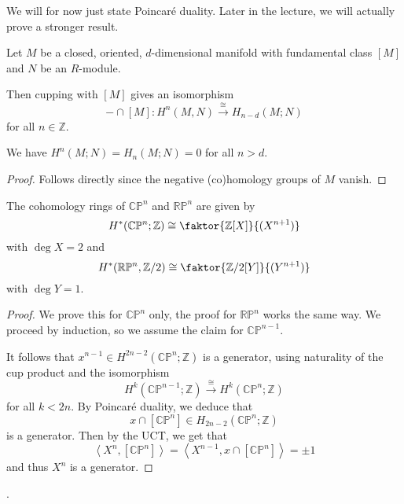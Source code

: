 We will for now just state Poincaré duality.
Later in the lecture, we will actually prove a stronger result.

\begin{theorem}
  \label{thm:poincare-duality}
  Let $M$ be a closed, oriented, $d$-di\-men\-sion\-al manifold 
  with fundamental class $[M]$ and  $N$ be an  $R$-module.

  Then cupping with $[M]$ gives an isomorphism
   \[
     - \cap [M] \colon   H^n(M,N) \xrightarrow{\cong} H_{n-d}(M;N)
  \]
  for all $n\in \mathbb{Z}$.
\end{theorem}

\begin{corollary}
  We have $H^n(M;N) = H_n(M;N) = 0$ for all $n>d$.
\end{corollary}
\begin{proof}
  Follows directly since the negative (co)homology groups of $M$
  vanish.
\end{proof}

\begin{corollary}
  The cohomology rings of $\mathbb{C}\mathbb{P}^n$ and $\mathbb{R}\mathbb{P}^n$
  are given by
  \[
    H^*(\mathbb{C}\mathbb{P}^n;\mathbb{Z})
    \cong
    \faktor{\mathbb{Z}[X]}{(X^{n+1})}
  \]
  with $\deg X = 2$ and
  \[
    H^*(\mathbb{R}\mathbb{P}^n, \mathbb{Z}/2)
    \cong
    \faktor{\mathbb{Z}/2[Y]}{(Y^{n+1})}
  \]
  with $\deg Y = 1$.
\end{corollary}

\begin{proof}
  We prove this for $\mathbb{C}\mathbb{P}^n$ only,
  the proof for $\mathbb{R}\mathbb{P}^n$ works the same way.
  We proceed by induction, so we assume the claim for $\mathbb{C}\mathbb{P}^{n-1}$.

  It follows that $x^{n-1} \in H^{2n-2}(\mathbb{C}\mathbb{P}^n ;\mathbb{Z})$ 
  is a generator, using naturality of the cup product and the
  isomorphism
  \[
    H^k(\mathbb{C}\mathbb{P}^{n-1};\mathbb{Z})
    \xrightarrow{\cong}
    H^k(\mathbb{C}\mathbb{P}^n;\mathbb{Z})
  \] 
  for all $k<2n$. 
  By Poincaré duality, we deduce that
  \[
    x \cap [\mathbb{C}\mathbb{P}^n] \in H_{2n-2}(\mathbb{C}\mathbb{P}^n;\mathbb{Z})
  \]
  is a generator.
  Then by the UCT, we get that
  \[
    \left< X^n, [\mathbb{C}\mathbb{P}^n] \right>
    =
    \left< X^{n-1}, x \cap [\mathbb{C}\mathbb{P}^n] \right>
    =
    \pm 1
  \]
  and thus $X^n$ is a generator.
\end{proof}

.

